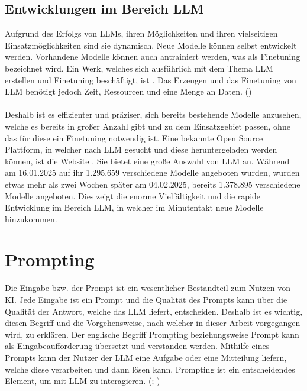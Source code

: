 \documentclass[12pt,toc=bib,toc=listof]{scrreprt}
\begin{document}
\subsection{Entwicklungen im Bereich LLM} %
\label{sec:entwicklungenImBereichLLM}
Aufgrund des Erfolgs von LLMs, ihren Möglichkeiten und ihren vielseitigen Einsatzmöglichkeiten sind sie dynamisch. Neue Modelle können selbst entwickelt werden. Vorhandene Modelle können auch antrainiert werden, was als \glqq Finetuning\grqq{} bezeichnet wird. Ein Werk, welches sich ausführlich mit dem Thema LLM erstellen und Finetuning beschäftigt, ist \textcite{Géron2019}. Das Erzeugen und das Finetuning von LLM benötigt jedoch Zeit, Ressourcen und eine Menge an Daten. (\cite{Géron2019})\\
\\
Deshalb ist es effizienter und präziser, sich bereits bestehende Modelle anzusehen, welche es bereits in großer Anzahl gibt und zu dem Einsatzgebiet passen, ohne das für diese ein Finetuning notwendig ist. Eine bekannte Open Source Plattform, in welcher nach LLM gesucht und diese heruntergeladen werden können, ist die Website \textcite{HuggingFace2025}. Sie bietet eine große Auswahl von LLM an. Während am 16.01.2025 auf ihr 1.295.659 verschiedene Modelle angeboten wurden, wurden etwas mehr als zwei Wochen später am 04.02.2025, bereits 1.378.895 verschiedene Modelle angeboten. Dies zeigt die enorme Vielfältigkeit und die rapide Entwicklung im Bereich LLM, in welcher im Minutentakt neue Modelle hinzukommen.\\

\section{Prompting} %
\label{sec:prompting}
Die Eingabe bzw. der Prompt ist ein wesentlicher Bestandteil zum Nutzen von KI. Jede Eingabe ist ein Prompt und die Qualität des Prompts kann über die Qualität der Antwort, welche das LLM liefert, entscheiden. Deshalb ist es wichtig, diesen Begriff und die Vorgehensweise, nach welcher in dieser Arbeit vorgegangen wird, zu erklären. Der englische Begriff Prompting beziehungsweise Prompt kann als Eingabeaufforderung übersetzt und verstanden werden. Mithilfe eines Prompts kann der Nutzer der LLM eine Aufgabe oder eine Mitteilung liefern, welche diese verarbeiten und dann lösen kann. Prompting ist ein entscheidendes Element, um mit LLM zu interagieren. (\cite{Gu2023}; \cite{Liu2023})\\
\newpage
\end{document}
